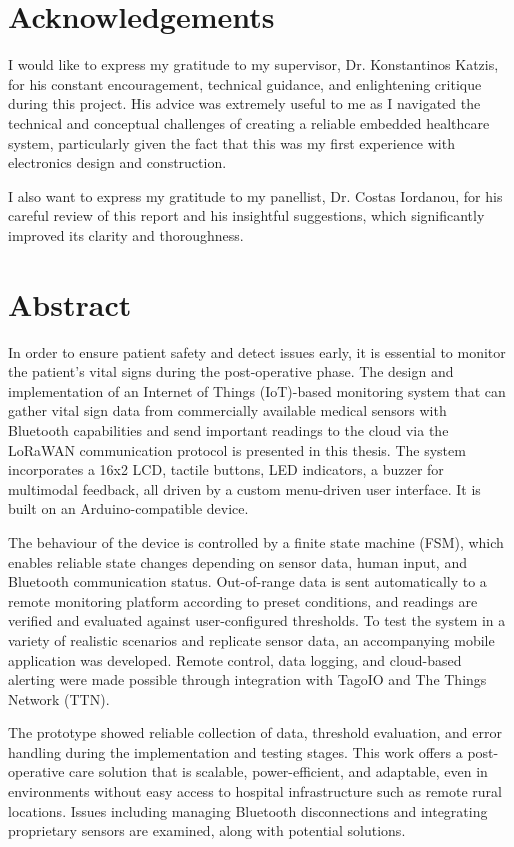 \section*{Acknowledgements}
I would like to express my gratitude to my supervisor, Dr. Konstantinos Katzis, for his constant encouragement, technical guidance, and enlightening critique during this project. His advice was extremely useful to me as I navigated the technical and conceptual challenges of creating a reliable embedded healthcare system, particularly given the fact that this was my first experience with electronics design and construction.

I also want to express my gratitude to my panellist, Dr. Costas Iordanou, for his careful review of this report and his insightful suggestions, which significantly improved its clarity and thoroughness.

\newpage
\section*{Abstract}
In order to ensure patient safety and detect issues early, it is essential to monitor the patient's vital signs during the post-operative phase. The design and implementation of an Internet of Things (IoT)-based monitoring system that can gather vital sign data from commercially available medical sensors with Bluetooth capabilities and send important readings to the cloud via the LoRaWAN communication protocol is presented in this thesis. The system incorporates a 16x2 LCD, tactile buttons, LED indicators, a buzzer for multimodal feedback, all driven by a custom menu-driven user interface. It is built on an Arduino-compatible device.

The behaviour of the device is controlled by a finite state machine (FSM), which enables reliable state changes depending on sensor data, human input, and Bluetooth communication status. Out-of-range data is sent automatically to a remote monitoring platform according to preset conditions, and readings are verified and evaluated against user-configured thresholds. To test the system in a variety of realistic scenarios and replicate sensor data, an accompanying mobile application was developed. Remote control, data logging, and cloud-based alerting were made possible through integration with TagoIO and The Things Network (TTN).

The prototype showed reliable collection of data, threshold evaluation, and error handling during the implementation and testing stages. This work offers a post-operative care solution that is scalable, power-efficient, and adaptable, even in environments without easy access to hospital infrastructure such as remote rural locations. Issues including managing Bluetooth disconnections and integrating proprietary sensors are examined, along with potential solutions.
\newpage
{
\tableofcontents
}
